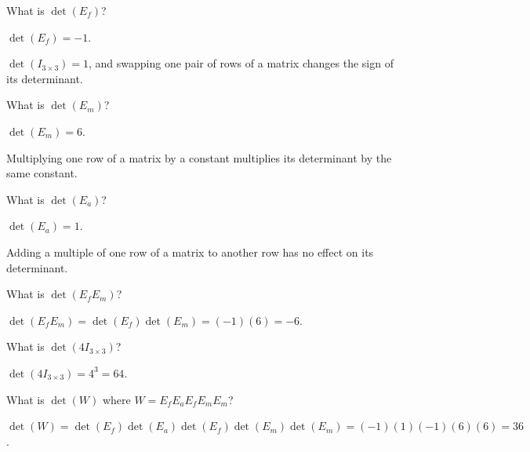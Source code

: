 \documentclass{problemset}
\begin{document}
	\begin{parts}
		\item What is $\det(E_f)$?
			\begin{solution}
				$\det(E_f)=-1$.

				$\det(I_{3\times 3})=1$, and swapping one pair of rows of a matrix
				changes the sign of its determinant.
			\end{solution}
		\item What is $\det(E_m)$?
			\begin{solution}
				$\det(E_m)=6$.

				Multiplying one row of a matrix by a constant multiplies its
				determinant by the same constant.
			\end{solution}
		\item What is $\det(E_a)$?
			\begin{solution}
				$\det(E_a)=1$.

				Adding a multiple of one row of a matrix to another row has no
				effect on its determinant.
			\end{solution}
		\item What is $\det(E_fE_m)$?
			\begin{solution}[inline]
				$\det(E_fE_m)=\det(E_f)\det(E_m)=(-1)(6)=-6$.
			\end{solution}
		\item What is $\det(4I_{3\times 3})$?
			\begin{solution}[inline]
				$\det(4I_{3\times 3})=4^3=64$.
			\end{solution}
		\item What is $\det(W)$ where $W=E_fE_aE_fE_mE_m$?
			\begin{solution}
				$\det(W)=\det(E_f)\det(E_a)\det(E_f)\det(E_m)\det(E_m)=(-1)(1)(-1)(6)(6)=36$.
			\end{solution}
	\end{parts}
\end{document}

